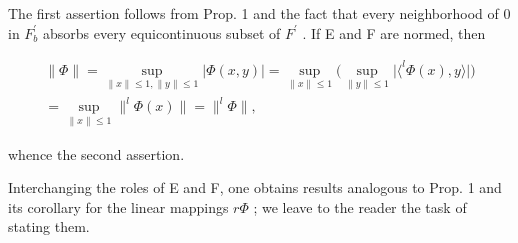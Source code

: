 The first assertion follows from Prop. 1 and the fact that every neighborhood of 0 in \(F_{b}^{\prime}\) absorbs every equicontinuous subset of \(F^{\prime}\) . If E and F are normed, then

\[
\begin{array}{c} \| \Phi \| = \sup _ {\| x \| \leqslant 1, \| y \| \leqslant 1} | \Phi (x, y) | = \sup _ {\| x \| \leqslant 1} \Big (\sup _ {\| y \| \leqslant 1} \big | \langle^ {l} \Phi (x), y \rangle \big | \Big) \\ = \sup _ {\| x \| \leqslant 1} \| ^ {l} \Phi (x) \| = \| ^ {l} \Phi \|, \end{array}
\]

whence the second assertion.

Interchanging the roles of E and F, one obtains results analogous to Prop. 1 and its corollary for the linear mappings \(r\Phi\) ; we leave to the reader the task of stating them.

